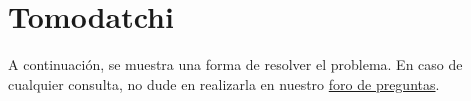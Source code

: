 \section{Tomodatchi}

A continuación, se muestra una forma de resolver el problema. En caso de cualquier consulta, no dude en realizarla en nuestro \href{https://aula.usm.cl/mod/forum/view.php?id=2654494}{foro de preguntas}.


